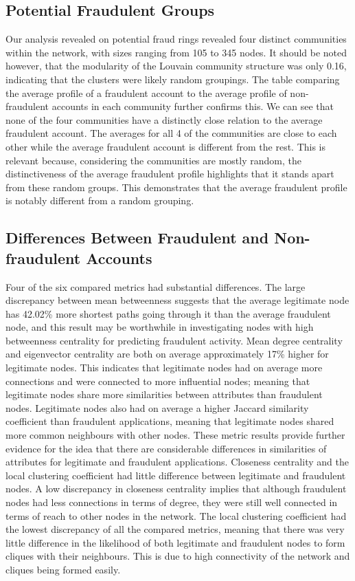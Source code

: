 \documentclass{styles/svproc}
\begin{document}
\subsection{Potential Fraudulent Groups}
Our analysis revealed on potential fraud rings revealed four distinct communities within the network, with sizes ranging from 105 to 345 nodes. It should be noted however, that the modularity of the Louvain community structure was only 0.16, indicating that the clusters were likely random groupings. The table comparing the average profile of a fraudulent account to the average profile of non-fraudulent accounts in each community further confirms this. We can see that none of the four communities have a distinctly close relation to the average fraudulent account. The averages for all 4 of the communities are close to each other while the average fraudulent account is different from the rest. This is relevant because, considering the communities are mostly random, the distinctiveness of the average fraudulent profile highlights that it stands apart from these random groups. This demonstrates that the average fraudulent profile is notably different from a random grouping.

\subsection{Differences Between Fraudulent and Non-fraudulent Accounts}
Four of the six compared metrics had substantial differences. The large discrepancy between mean betweenness suggests that the average legitimate node has 42.02\% more shortest paths going through it than the average fraudulent node, and this result may be worthwhile in investigating nodes with high betweenness centrality for predicting fraudulent activity. Mean degree centrality and eigenvector centrality are both on average approximately 17\% higher for legitimate nodes. This indicates that legitimate nodes had on average more connections and were connected to more influential nodes; meaning that legitimate nodes share more similarities between attributes than fraudulent nodes. Legitimate nodes also had on average a higher Jaccard similarity coefficient than fraudulent applications, meaning that legitimate nodes shared more common neighbours with other nodes. These metric results provide further evidence for the idea that there are  considerable differences in similarities of attributes for legitimate and fraudulent applications. Closeness centrality and the local clustering coefficient had little difference between legitimate and fraudulent nodes. A low discrepancy in closeness centrality implies that although fraudulent nodes had less connections in terms of degree, they were still well connected in terms of reach to other nodes in the network. The local clustering coefficient had the lowest discrepancy of all the compared metrics, meaning that there was very little difference in the likelihood of both legitimate and fraudulent nodes to form cliques with their neighbours. This is due to high connectivity of the network and cliques being formed easily. 
\end{document}
